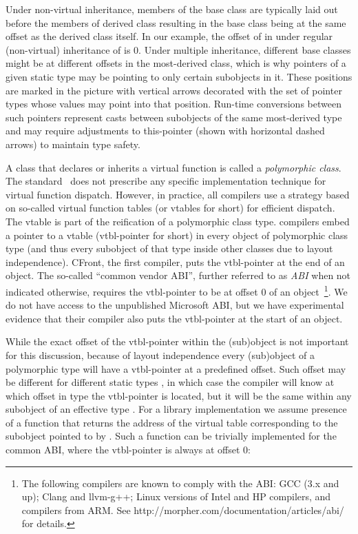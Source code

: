 Under non-virtual inheritance, members of the base class are typically laid out 
before the members of derived class resulting in the base class being at the 
same offset as the derived class itself. In our example, the offset of  
in  under regular (non-virtual) inheritance of  is 0.
Under multiple inheritance, different base classes might be at different offsets 
in the most-derived class, which is why pointers of a given static type may be 
pointing to only certain subobjects in it. These positions are marked in the 
picture with vertical arrows decorated with the set of pointer types whose 
values may point into that position. Run-time conversions between such pointers 
represent casts between subobjects of the same most-derived type and may require 
adjustments to this-pointer (shown with horizontal dashed arrows) to maintain 
type safety.

A class that declares or inherits a virtual function is called a 
\emph{polymorphic class}. The \Cpp{} standard~\cite{C++11} does not prescribe any 
specific implementation technique for virtual function dispatch.
However, in practice, all \Cpp{} compilers use a strategy based on so-called
virtual function tables (or vtables for short) for efficient dispatch. 
The vtable is part of the reification of a polymorphic class type.  
\Cpp{} compilers embed a pointer to a vtable (vtbl-pointer for short) in every object of
polymorphic class type (and thus every subobject of that type inside other 
classes due to layout independence). CFront, the first \Cpp{} compiler, puts the 
vtbl-pointer 
at the end of an object. The so-called ``common vendor \Cpp{} ABI''\cite{C++ABI}, 
further referred to as \emph{\Cpp{} ABI} when not indicated otherwise, requires the 
vtbl-pointer to be at offset 0 of an object~\footnote{The following compilers 
are known to comply with the \Cpp{} ABI: GCC (3.x and up); Clang and llvm-g++; 
Linux versions of Intel and HP compilers, and compilers from ARM. See 
http://morpher.com/documentation/articles/abi/ for details.}. We do not have 
access to the unpublished Microsoft ABI, but we have experimental evidence that 
their \Cpp{} compiler also puts the vtbl-pointer at the start of an object.

While the exact offset of the vtbl-pointer within the (sub)object is not important 
for this discussion, because of layout independence every (sub)object of a 
polymorphic type  will have a vtbl-pointer at a predefined offset. 
Such offset may be different for different static types , in which case 
the compiler will know at which offset in type  the vtbl-pointer is 
located, but it will be the same within any subobject of an effective type 
. For a library implementation we assume presence of a function 
that returns the address of the virtual table corresponding to the subobject 
pointed to by . Such a function can be trivially implemented for the 
common \Cpp{} ABI, where the vtbl-pointer is always at offset 0:

